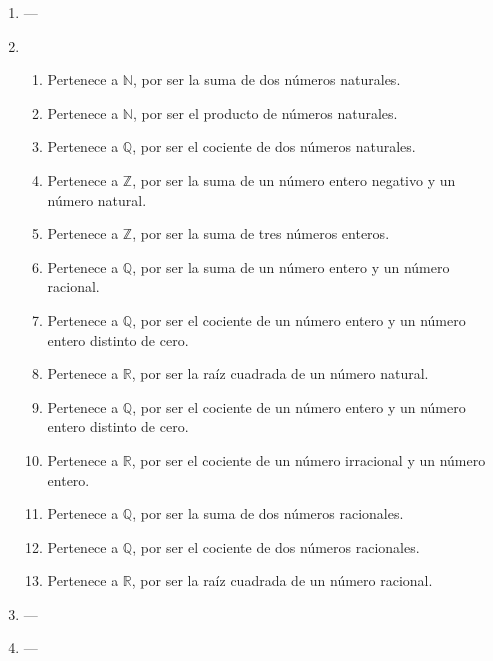 \documentclass[a4paper]{article}
\newcommand{\exercise}{\item}
\begin{document}
\begin{enumerate}
\begin{enumerate} [label=(\alph*)]
		\item Incorrecto. $68$ es un número par ya que puede escribirse como $2k$ con $k=34 \in \mathbb{Z}$
		\item Correcto ya que $-12$ puede escribirse como $2k$ con $k=-6 \in \mathbb{Z}$
		\item Correcto ya que $0$ puede escribirse como $2k$ con $k=0 \in \mathbb{Z}$
		\item Correcto ya que $30$ puede escribirse como $5k$ con $k=6 \in \mathbb{Z}$
		\item Incorrecto. $17$ no es múltiplo de 3 ya que no puede escribirse como $3k$ con $k \in \mathbb{Z}$
		\item Correcto ya que $-12$ puede escribirse como $4k$ con $k=-3 \in \mathbb{Z}$
		\item Correcto ya que $-12$ puede escribirse como $2k$ con $k=-6 \in \mathbb{Z}$
		\item Incorrecto. $11$ no es múltiplo de $-3$ ya que no puede escribirse como $-3k$ con $k \in \mathbb{Z}$
\end{enumerate}\exercise---\exercise\begin{enumerate} [label=(\alph*)]		\item Pertenece a $\mathbb{N}$, por ser la suma de dos números naturales.
		\item Pertenece a $\mathbb{N}$, por ser el producto de números naturales.
		\item Pertenece a $\mathbb{Q}$, por ser el cociente de dos números naturales. 
		\item Pertenece a $\mathbb{Z}$, por ser la suma de un número entero negativo y un número natural.
		\item Pertenece a $\mathbb{Z}$, por ser la suma de tres números enteros.
		\item Pertenece a $\mathbb{Q}$, por ser la suma de un número entero y un número racional.
		\item Pertenece a $\mathbb{Q}$, por ser el cociente de un número entero y un número entero distinto de cero.
		\item Pertenece a $\mathbb{R}$, por ser la raíz cuadrada de un número natural.
		\item Pertenece a $\mathbb{Q}$, por ser el cociente de un número entero y un número entero distinto de cero.
		\item Pertenece a $\mathbb{R}$, por ser el cociente de un número irracional y un número entero. 
		\item Pertenece a $\mathbb{Q}$, por ser la suma de dos números racionales.
		\item Pertenece a $\mathbb{Q}$, por ser el cociente de dos números racionales.
		\item Pertenece a $\mathbb{R}$, por ser la raíz cuadrada de un número racional.
\end{enumerate}\exercise---\exercise---\end{enumerate}
\end{document}
